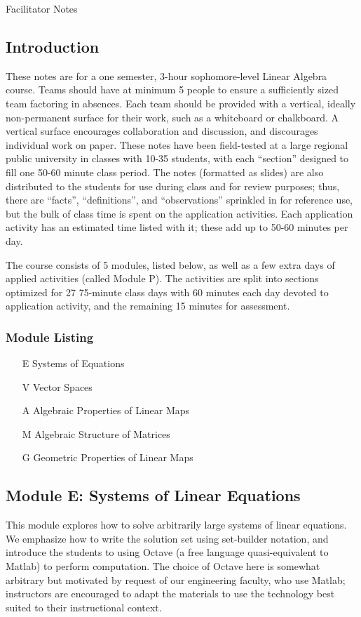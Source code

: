\documentclass{article}
\begin{document}
\begin{center}
{\Large Facilitator Notes}
\end{center}

\subsection*{Introduction}

These notes are for a one semester, 3-hour sophomore-level Linear Algebra course.  Teams should have at minimum 5 people to ensure a sufficiently sized team factoring in absences.  Each team should be provided with a vertical, ideally non-permanent surface for their work, such as a whiteboard or chalkboard.  A vertical surface encourages collaboration and discussion, and discourages individual work on paper.  These notes have been field-tested at a large regional public university in classes with 10-35 students, with each ``section'' designed to fill one 50-60 minute class period.  The notes (formatted as slides) are also distributed to the students for use during class and for review purposes; thus, there are ``facts'', ``definitions'', and ``observations'' sprinkled in for reference use, but the bulk of class time is spent on the application activities.  Each application activity has an estimated time listed with it; these add up to 50-60 minutes per day.

The course consists of 5 modules, listed below, as well as a few extra days of applied activities (called Module P). The activities are split into sections optimized for 27 75-minute class days with 60 minutes each day devoted to application activity, and the remaining 15 minutes for assessment.  

\subsubsection*{Module Listing}
\begin{enumerate}
\item [E] Systems of Equations
\item [V] Vector Spaces
\item [A] Algebraic Properties of Linear Maps
\item [M] Algebraic Structure of Matrices
\item [G] Geometric Properties of Linear Maps
\end{enumerate}

\subsection*{Module E: Systems of Linear Equations}
This module explores how to solve arbitrarily large systems of linear equations.  We emphasize how to write the solution set using set-builder notation, and introduce the students to using Octave (a free language quasi-equivalent to Matlab) to perform computation.  The choice of Octave here is somewhat arbitrary but motivated by request of our engineering faculty, who use Matlab; instructors are encouraged to adapt the materials to use the technology best suited to their instructional context.  
\end{document}
